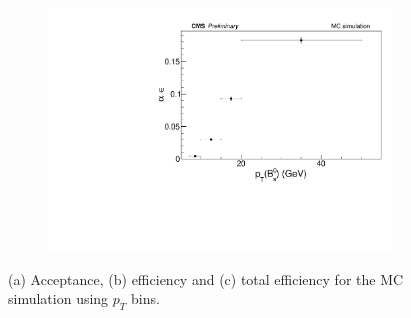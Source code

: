 \begin{figure}[htp!]
	\begin{subfigure}[b]{0.8\textwidth}
		\centering
		\includegraphics[width=\textwidth]{MainContent/Figs/effy/totaleffy_ptbins.PDF}
		\caption{}%
	\end{subfigure}
	\caption{(a) Acceptance, (b) efficiency and (c) total efficiency for the MC simulation using $p_T$ bins.}
	\label{fig:effy_ptbins}
\end{figure}

